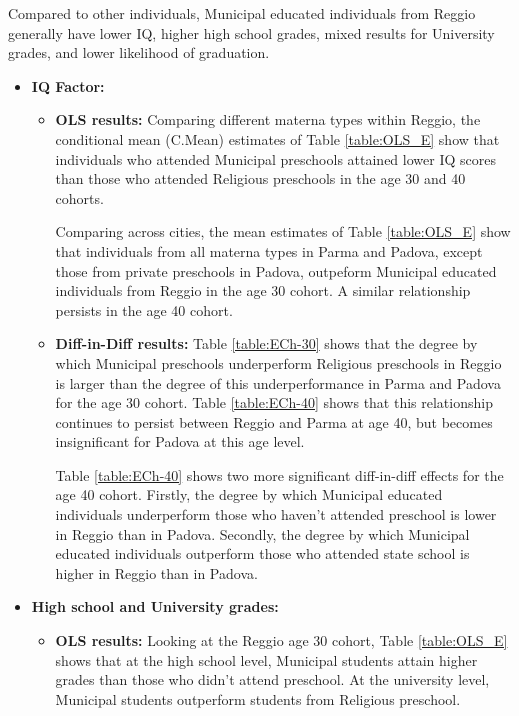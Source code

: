 \documentclass[11pt]{article}
\begin{document}
Compared to other individuals, Municipal educated individuals from Reggio generally have lower IQ, higher high school grades, mixed results for University grades, and lower likelihood of graduation.
\begin{itemize}
\item \textbf{IQ Factor:} 
	\begin{itemize}
	\item \textbf{OLS results:} Comparing different materna types within Reggio, the conditional mean (C.Mean) estimates of Table \ref{table:OLS_E} show that individuals who attended Municipal preschools attained lower IQ scores than those who attended Religious preschools in the age 30 and 40 cohorts.
	
	Comparing across cities, the mean estimates of Table \ref{table:OLS_E} show that individuals from all materna types in Parma and Padova, except those from private preschools in Padova, outpeform Municipal educated individuals from Reggio in the age 30 cohort. A similar relationship persists in the age 40 cohort.
	
	\item \textbf{Diff-in-Diff results:} Table \ref{table:ECh-30} shows that the degree by which Municipal preschools underperform Religious preschools in Reggio is larger than the degree of this underperformance in Parma and Padova for the age 30 cohort. Table \ref{table:ECh-40} shows that this relationship continues to persist between Reggio and Parma at age 40, but becomes insignificant for Padova at this age level.
	
	Table \ref{table:ECh-40} shows two more significant diff-in-diff effects for the age 40 cohort. Firstly, the degree by which Municipal educated individuals underperform those who haven't attended preschool is lower in Reggio than in Padova. Secondly, the degree by which Municipal educated individuals outperform those who attended state school is higher in Reggio than in Padova.
	\end{itemize}
	
\item \textbf{High school and University grades:} 
	\begin{itemize}
	\item \textbf{OLS results:} Looking at the Reggio age 30 cohort, Table \ref{table:OLS_E} shows that at the high school level, Municipal students attain higher grades than those who didn't attend preschool. At the university level, Municipal students outperform students from Religious preschool.
	

\end{itemize}
\end{itemize}
\end{document}
